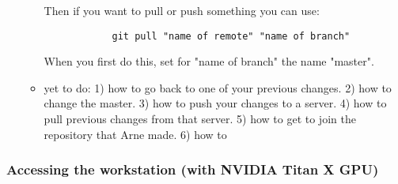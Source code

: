 \documentclass{article}
\begin{document}
\begin{itemize}
\begin{itemize}
        Then if you want to pull or push something you can use:
        \begin{verbatim}
            git pull "name of remote" "name of branch"
        \end{verbatim}
        When you first do this, set for "name of branch" the name "master". 
        \item yet to do: 1) how to go back to one of your previous changes. 2) how to change the master. 3) how to push your changes to a server. 4) how to pull previous changes from that server. 5) how to get to join the repository that Arne made. 6) how to 
    \end{itemize}
\end{itemize}


\subsubsection{Accessing the workstation (with NVIDIA Titan X GPU)}
\end{document}
